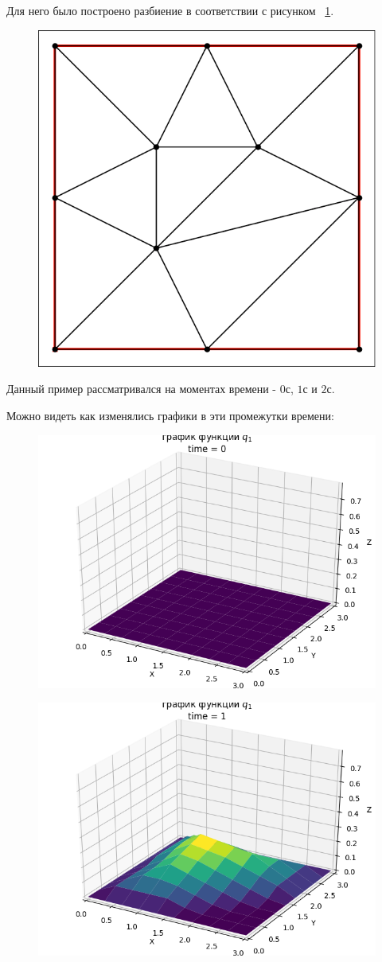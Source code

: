 \documentclass[14pt]{extreport}
\begin{document}
Для него было построено разбиение в соответствии с рисунком ~\ref{img:ex1:mesh}.

\begin{figure}[H]
\centerline{
\includegraphics[width=0.5\linewidth]{images/ex1/mesh}}
\caption{}
\label{img:ex1:mesh}
\end{figure}


Данный пример рассматривался на моментах времени - $0$с, $1$с и $2$с.

Можно видеть как изменялись графики в эти промежутки времени:

\begin{figure}[H]
\centerline{
\includegraphics[width=0.5\linewidth]{images/ex1/q_1/0}}
\caption{}
\label{img:ex1:q1:0}
\end{figure}

\begin{figure}[H]
\centerline{
\includegraphics[width=0.5\linewidth]{images/ex1/q_1/1}}
\caption{}
\label{img:ex1:q1:1}
\end{figure}
\end{document}
